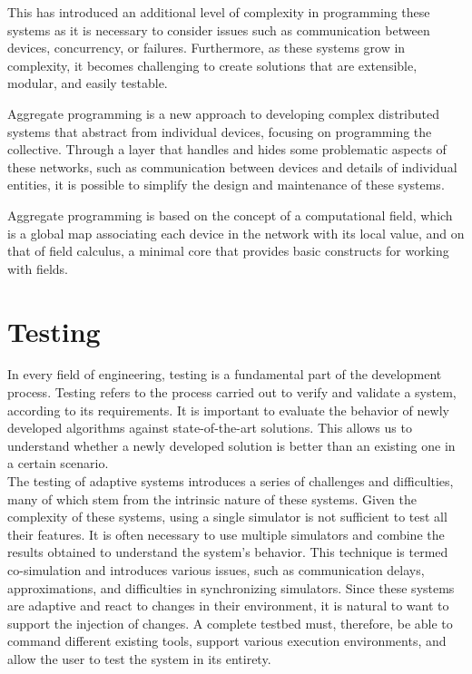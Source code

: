 \documentclass[12pt,a4paper,openright,twoside]{book}
\begin{document}
This has introduced an additional level of complexity in programming these systems as it is necessary to consider issues such as communication between devices, 
concurrency, or failures. Furthermore, as these systems grow in complexity, it becomes challenging to create solutions that are extensible, modular, and easily testable. \cite{DBLP:conf/ecoop/CasadeiV16}

Aggregate programming is a new approach to developing complex distributed systems that abstract from individual devices, focusing on programming the collective. 
Through a layer that handles and hides some problematic aspects of these networks, such as communication between devices and details of individual entities, 
it is possible to simplify the design and maintenance of these systems. \cite{DBLP:journals/computer/BealPV15, DBLP:conf/sfm/BealV16}

Aggregate programming is based on the concept of a computational field, which is a global map associating each device in the network with its local value, 
and on that of field calculus, a minimal core that provides basic constructs for working with fields. \cite{DBLP:journals/corr/ViroliADPB16}

\section{Testing}

In every field of engineering, testing is a fundamental part of the development process.
Testing refers to the process carried out to verify and validate a system, according to its requirements. \cite{Spillner2011}
It is important to evaluate the behavior of newly developed algorithms against state-of-the-art solutions.
This allows us to understand whether a newly developed solution is better than an existing one in a certain scenario. \\

The testing of adaptive systems introduces a series of challenges and difficulties, many of which stem from the intrinsic nature of these systems. 
Given the complexity of these systems, using a single simulator is not sufficient to test all their features. 
It is often necessary to use multiple simulators and combine the results obtained to understand the system's behavior. 
This technique is termed co-simulation and introduces various issues, such as communication delays, approximations, and difficulties in synchronizing simulators. \cite{DBLP:journals/simpra/ThuleLGML19}
Since these systems are adaptive and react to changes in their environment, it is natural to want to support the injection of changes. \cite{DBLP:conf/icac/BrownHHLLSY04}
A complete testbed must, therefore, be able to command different existing tools, support various execution environments, and allow the user to test the system in its entirety.
\end{document}
